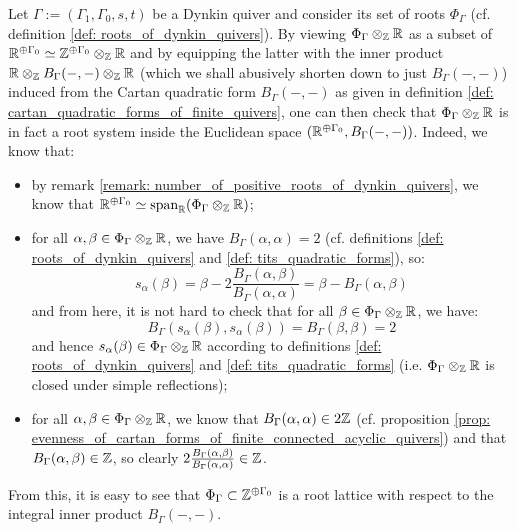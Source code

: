             \begin{example} \label{example: root_systems_of_dynkin_quivers}
                Let $\Gamma := (\Gamma_1, \Gamma_0, s, t)$ be a Dynkin quiver and consider its set of roots $\Phi_{\Gamma}$ (cf. definition \ref{def: roots_of_dynkin_quivers}). By viewing $\Phi_{\Gamma} \tensor_{\Z} \R$ as a subset of $\R^{\oplus \Gamma_0} \cong \Z^{\oplus \Gamma_0} \tensor_{\Z} \R$ and by equipping the latter with the inner product $\R \tensor_{\Z} B_{\Gamma}(-, -) \tensor_{\Z} \R$ (which we shall abusively shorten down to just $B_{\Gamma}(-, -)$) induced from the Cartan quadratic form $B_{\Gamma}(-, -)$ as given in definition \ref{def: cartan_quadratic_forms_of_finite_quivers}, one can then check that $\Phi_{\Gamma} \tensor_{\Z} \R$ is in fact a root system inside the Euclidean space $(\mathbb{R}^{\oplus \Gamma_0}, B_{\Gamma}(-, -))$. Indeed, we know that:
                    \begin{itemize}
                        \item by remark \ref{remark: number_of_positive_roots_of_dynkin_quivers}, we know that $\R^{\oplus \Gamma_0} \cong \span_{\R} (\Phi_{\Gamma} \tensor_{\Z} \R)$;
                        \item for all $\alpha, \beta \in \Phi_{\Gamma} \tensor_{\Z} \R$, we have $B_{\Gamma}(\alpha, \alpha) = 2$ (cf. definitions \ref{def: roots_of_dynkin_quivers} and \ref{def: tits_quadratic_forms}), so:
                            $$s_{\alpha}(\beta) = \beta - 2\frac{B_{\Gamma}(\alpha, \beta)}{B_{\Gamma}(\alpha, \alpha)} = \beta - B_{\Gamma}(\alpha, \beta)$$
                        and from here, it is not hard to check that for all $\beta \in \Phi_{\Gamma} \tensor_{\Z} \R$, we have:
                            $$B_{\Gamma}(s_{\alpha}(\beta), s_{\alpha}(\beta)) = B_{\Gamma}(\beta, \beta) = 2$$
                        and hence $s_{\alpha}(\beta) \in \Phi_{\Gamma} \tensor_{\Z} \R$ according to definitions \ref{def: roots_of_dynkin_quivers} and \ref{def: tits_quadratic_forms} (i.e. $\Phi_{\Gamma} \tensor_{\Z} \R$ is closed under simple reflections);
                        \item for all $\alpha, \beta \in \Phi_{\Gamma} \tensor_{\Z} \R$, we know that $B_{\Gamma}(\alpha, \alpha) \in 2\mathbb{Z}$ (cf. proposition \ref{prop: evenness_of_cartan_forms_of_finite_connected_acyclic_quivers}) and that $B_{\Gamma}(\alpha, \beta) \in \mathbb{Z}$, so clearly $2\frac{B_{\Gamma}(\alpha, \beta)}{B_{\Gamma}(\alpha, \alpha)} \in \mathbb{Z}$. 
                    \end{itemize}
                From this, it is easy to see that $\Phi_{\Gamma} \subset \mathbb{Z}^{\oplus \Gamma_0}$ is a root lattice with respect to the integral inner product $B_{\Gamma}(-, -)$. 
            \end{example}
